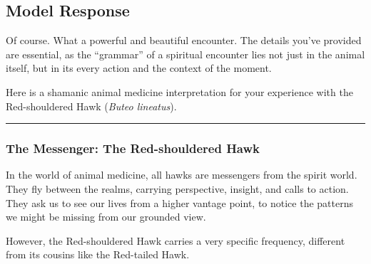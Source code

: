 \documentclass{article}
\begin{document}
\medskip

\subsection*{Model Response}\label{model-response}

Of course. What a powerful and beautiful encounter. The details you've
provided are essential, as the ``grammar'' of a spiritual encounter lies
not just in the animal itself, but in its every action and the context
of the moment.

Here is a shamanic animal medicine interpretation for your experience
with the Red-shouldered Hawk (\emph{Buteo lineatus}).

\begin{center}\rule{0.5\linewidth}{0.5pt}\end{center}

\subsubsection*{The Messenger: The Red-shouldered
Hawk}\label{the-messenger-the-red-shouldered-hawk}

In the world of animal medicine, all hawks are messengers from the
spirit world. They fly between the realms, carrying perspective,
insight, and calls to action. They ask us to see our lives from a higher
vantage point, to notice the patterns we might be missing from our
grounded view.

However, the Red-shouldered Hawk carries a very specific frequency,
different from its cousins like the Red-tailed Hawk.
\end{document}
